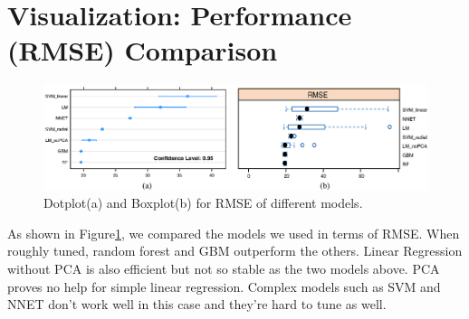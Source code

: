 \documentclass{article}
\begin{document}
\section{Visualization: Performance (RMSE) Comparison}
	\begin{figure}[!htb]
		\centering
 		\includegraphics[width=1\linewidth]{Rplot2.eps}
 		\caption{Dotplot(a) and Boxplot(b) for RMSE of different models. }
 		\label{fig:rplot2}
	\end{figure}

As shown in Figure\ref{fig:rplot2}, we compared the models we used in terms of RMSE. When roughly tuned, random forest and GBM outperform the others. Linear Regression without PCA is also efficient but not so stable as the two models above. PCA proves no help for simple linear regression. Complex models such as SVM and NNET don't work well in this case and they're hard to tune as well. 
\end{document}
